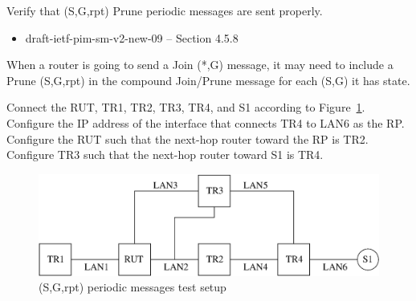 \documentclass[11pt]{report}
\begin{document}
Verify that (S,G,rpt) Prune periodic messages are sent properly.

\begin{itemize}
  \item draft-ietf-pim-sm-v2-new-09 -- Section 4.5.8
\end{itemize}

When a router is going to send a Join (*,G) message, it may need to include a
Prune (S,G,rpt) in the compound Join/Prune message for each (S,G) it has
state.

Connect the RUT, TR1, TR2, TR3, TR4, and S1 according to
Figure~\ref{fig:pim_test_4_8_sg_rpt_periodic_messages}.
Configure the IP address of the interface that connects TR4 to LAN6 as the RP.
Configure the RUT such that the next-hop router toward the RP is TR2.
Configure TR3 such that the next-hop router toward S1 is TR4.

\begin{figure}[htbp]
  \begin{center}
    \includegraphics[scale=0.8]{figs/pim_test_4_8_sg_rpt_periodic_messages}
    \caption{(S,G,rpt) periodic messages test setup}
    \label{fig:pim_test_4_8_sg_rpt_periodic_messages}
  \end{center}
\end{figure}


\end{document}
